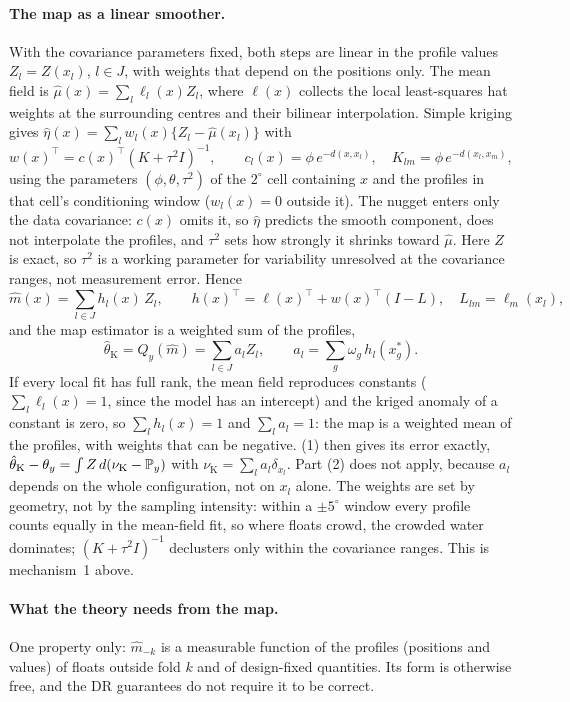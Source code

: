 \paragraph{The map as a linear smoother.} With the covariance parameters fixed, both steps are linear
in the profile values $Z_l=Z(x_l)$, $l\in J$, with weights that depend on the positions only. The
mean field is $\hat\mu(x)=\sum_l\ell_l(x)Z_l$, where $\ell(x)$ collects the local least-squares hat
weights at the surrounding centres and their bilinear interpolation. Simple kriging gives
$\hat\eta(x)=\sum_lw_l(x)\{Z_l-\hat\mu(x_l)\}$ with
\[
  w(x)^\top=c(x)^\top(K+\tau^2I)^{-1},\qquad c_l(x)=\phi\,e^{-d(x,x_l)},\quad K_{lm}=\phi\,e^{-d(x_l,x_m)},
\]
using the parameters $(\phi,\theta,\tau^2)$ of the $2^\circ$ cell containing $x$ and the profiles in that
cell's conditioning window ($w_l(x)=0$ outside it). The nugget enters only the data covariance: $c(x)$
omits it, so $\hat\eta$ predicts the smooth component, does not interpolate the profiles, and $\tau^2$
sets how strongly it shrinks toward $\hat\mu$. Here $Z$ is exact, so $\tau^2$ is a working parameter for
variability unresolved at the covariance ranges, not measurement error. Hence
\[
  \hat m(x)=\sum_{l\in J}h_l(x)\,Z_l,\qquad h(x)^\top=\ell(x)^\top+w(x)^\top(I-L),\quad L_{lm}=\ell_m(x_l),
\]
and the map estimator is a weighted sum of the profiles,
\[
  \hat\theta_{\mathrm K}=Q_y(\hat m)=\sum_{l\in J}a_lZ_l,\qquad a_l=\sum_g\omega_g\,h_l(x^*_g).
\]
If every local fit has full rank, the mean field reproduces constants ($\sum_l\ell_l(x)=1$, since the
model has an intercept) and the kriged anomaly of a constant is zero, so $\sum_lh_l(x)=1$ and
$\sum_la_l=1$: the map is a weighted mean of the profiles, with weights that can be negative.
(1) then gives its error exactly, $\hat\theta_{\mathrm K}-\theta_y=\int Z\,d(\nu_{\mathrm K}-\mathbb{P}_y)$
with $\nu_{\mathrm K}=\sum_la_l\delta_{x_l}$. Part (2) does not apply, because $a_l$ depends on the
whole configuration, not on $x_l$ alone. The weights are set by geometry, not by the sampling
intensity: within a $\pm5^\circ$ window every profile counts equally in the mean-field fit, so where
floats crowd, the crowded water dominates; $(K+\tau^2I)^{-1}$ declusters only within the covariance
ranges. This is mechanism~1 above.

\paragraph{What the theory needs from the map.} One property only: $\hat m_{-k}$ is a measurable
function of the profiles (positions and values) of floats outside fold $k$ and of design-fixed
quantities. Its form is otherwise free, and the DR guarantees do not require it to be correct.

